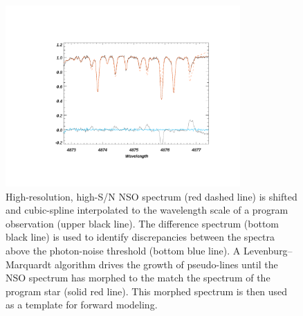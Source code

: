 \begin{figure}
    \centering
    \includegraphics[trim=5cm 3cm 3cm 4cm, clip, width=0.8\textwidth]{figures-4/morph_fit.pdf}
    \caption[NSO template for forward modeling]{High-resolution, high-S/N NSO spectrum (red dashed line) is shifted and cubic-spline interpolated to the wavelength scale of a program observation (upper black line). The difference spectrum (bottom black line) is used to identify discrepancies between the spectra above the photon-noise threshold (bottom blue line). A Levenburg--Marquardt algorithm drives the growth of pseudo-lines until the NSO spectrum has morphed to the match the spectrum of the program star (solid red line). This morphed spectrum is then used as a template for forward modeling.}
    \label{fig:morph}
\end{figure}

